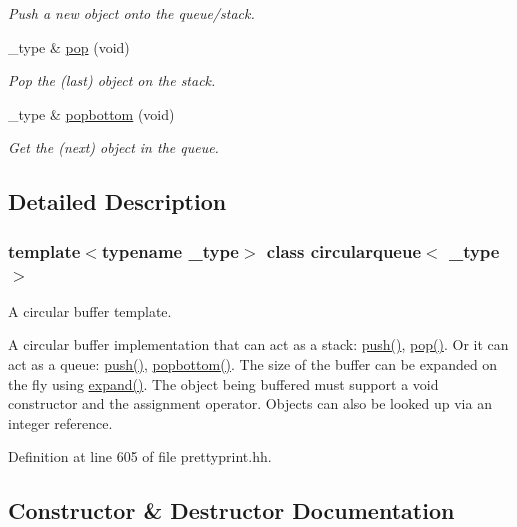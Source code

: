 \begin{DoxyCompactItemize}
\begin{DoxyCompactList}\small\item\em Push a new object onto the queue/stack. \end{DoxyCompactList}\item 
\+\_\+type \& \mbox{\hyperlink{classcircularqueue_abfb862a73808c55214d026eb43738f0b}{pop}} (void)
\begin{DoxyCompactList}\small\item\em Pop the (last) object on the stack. \end{DoxyCompactList}\item 
\+\_\+type \& \mbox{\hyperlink{classcircularqueue_a5d1e7b79b064d02539960ea2a3e0d8cf}{popbottom}} (void)
\begin{DoxyCompactList}\small\item\em Get the (next) object in the queue. \end{DoxyCompactList}\end{DoxyCompactItemize}


\subsection{Detailed Description}
\subsubsection*{template$<$typename \+\_\+type$>$\newline
class circularqueue$<$ \+\_\+type $>$}

A circular buffer template. 

A circular buffer implementation that can act as a stack\+: \mbox{\hyperlink{classcircularqueue_a06f099e37388f3eccd8962f4d7199e17}{push()}}, \mbox{\hyperlink{classcircularqueue_abfb862a73808c55214d026eb43738f0b}{pop()}}. Or it can act as a queue\+: \mbox{\hyperlink{classcircularqueue_a06f099e37388f3eccd8962f4d7199e17}{push()}}, \mbox{\hyperlink{classcircularqueue_a5d1e7b79b064d02539960ea2a3e0d8cf}{popbottom()}}. The size of the buffer can be expanded on the fly using \mbox{\hyperlink{classcircularqueue_aef399e8b70e1ba008d6f515d9f45b59f}{expand()}}. The object being buffered must support a void constructor and the assignment operator. Objects can also be looked up via an integer reference. 

Definition at line 605 of file prettyprint.\+hh.



\subsection{Constructor \& Destructor Documentation}
\mbox{\label{classcircularqueue_a42319b17b68d214cbf35f4d92d6bb32e}} 
